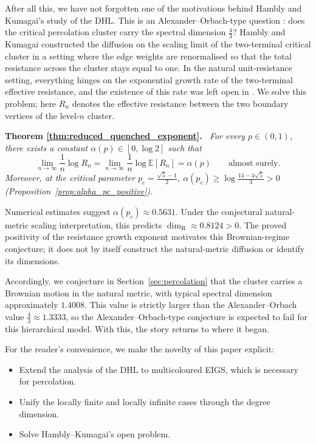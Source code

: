 \documentclass{article}
\newenvironment{restated}[1]{%
  \par\noindent\textbf{Theorem #1.}\itshape\ }%
  {\par}
\theoremstyle{plain}
\theoremstyle{definition}
\newcommand{\dimresis}{\dim_\mathrm{R}}
\begin{document}
After all this, we have not forgotten one of the motivations behind Hambly and Kumagai's study of the DHL.
This is an Alexander--Orbach-type question \cite{alexander1982density}: does the critical percolation cluster carry the spectral dimension $\frac43$?
Hambly and Kumagai constructed the diffusion on the scaling limit of the two-terminal critical cluster in a setting where the edge weights are renormalised so that the total resistance across the cluster stays equal to one.
In the natural unit-resistance setting, everything hinges on the exponential growth rate of the two-terminal effective resistance, and the existence of this rate was left open in \cite{hambly2010diffusion}.
We solve this problem; here $R_n$ denotes the effective resistance between the two boundary vertices of the level-$n$ cluster.

\begin{restated}{\ref{thm:reduced_quenched_exponent}}
For every $p\in(0,1)$, there exists a constant $\alpha(p)\in[0,\log 2]$ such that
\[
\lim_{n\to\infty}\frac1n\log R_n=\lim_{n\to\infty}\frac1n\log\mathbb E[R_n]=\alpha(p)
\qquad\text{almost surely}.
\]
Moreover, at the critical parameter $p_c=\frac{\sqrt5-1}{2}$, $\alpha(p_c)\ge\log\frac{14-4\sqrt5}{3}>0$ (Proposition~\ref{prop:alpha_pc_positive}).
\end{restated}

\begingroup\color{red}
Numerical estimates suggest $\alpha(p_c)\approx0.5631$.
Under the conjectural natural-metric scaling interpretation, this predicts
$\dimresis\approx0.8124>0$. The proved positivity of the resistance
growth exponent motivates this Brownian-regime conjecture; it does not
by itself construct the natural-metric diffusion or identify its dimensions.
\endgroup{}

Accordingly, we conjecture in Section~\ref{sec:percolation} that the cluster carries a Brownian motion in the natural metric, with typical spectral dimension approximately $1.4008$.
This value is strictly larger than the Alexander--Orbach value $\frac43\approx 1.3333$, so the Alexander--Orbach-type conjecture is expected to fail for this hierarchical model.
With this, the story returns to where it began.


\bigskip


For the reader's convenience, we make the novelty of this paper explicit:
\begin{itemize}
\item Extend the analysis of the DHL to multicoloured EIGS, which is necessary for percolation.
\item Unify the locally finite and locally infinite cases through the degree dimension.
\item Solve Hambly--Kumagai's open problem.
\end{itemize}
\end{document}
